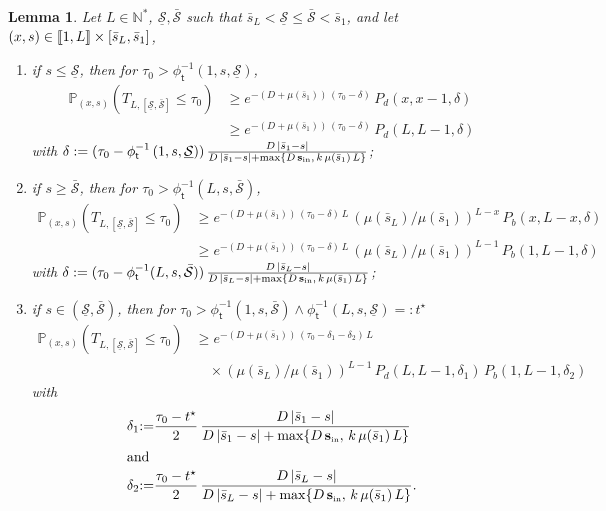 \documentclass[10pt]{amsart}
\newtheorem{lemm}[theo]{Lemma}\newtheorem{prop}[theo]{Proposition}\newtheorem{coro}[theo]{Corollary}\newtheorem{conj}[theo]{Conjecture}
\theoremstyle{definition}\newtheorem{defi}[theo]{Definition}\newtheorem{rema}[theo]{Remark}\newtheorem{exam}[theo]{Example}\newtheorem{exem}[theo]{Example}\newtheorem{nota}[theo]{Notation}
\newcommand{\llbracket}{\mathopen{[\mkern -2.7mu[}}
\newcommand{\rrbracket}{\mathclose{]\mkern -2.7mu]}}
\newcommand{\PP}{\mathbb{P}}
\newcommand{\NN}{\mathbb{N}}
\newcommand{\Sin}{{\mathbf s}_{\textrm{\tiny\rm in}}}
\newcommand{\Smin}{\underline{\mathcal{S}}}
\newcommand{\Smax}{\bar{\mathcal{S}}}
\newcommand{\barmu}{\mu(\bar s_1)}
\newcommand{\phit}{\phi_\textsf{t}^{-1}}
\newcommand{\1}{\mathbf{1}}
\begin{document}
\begin{lemm}\label{lemma.reach.T.Smin.Smax}
Let $L \in \NN^*$, $\Smin,\Smax$ such that $\bar s_L<\Smin\leq\Smax<\bar s_1$, and let $(x,s)\in \llbracket 1, L\rrbracket \times [\bar s_L,\bar s_1]$,
\begin{enumerate}
\item \label{lemma.reach.T.Smin.Smax.s_inf_Smin}
if $s\leq \Smin$, then for $\tau_0>\phit(1, s,\Smin)$,
\begin{align*}
\PP_{(x,s)}\left(T_{L,[\Smin,\Smax]}\leq \tau_0\right) &\geq e^{-(D+\barmu)\,(\tau_0-\delta)}\,P_d(x,x-1,\delta)\\
&\geq e^{-(D+\barmu)\,(\tau_0-\delta)}\,P_d(L,L-1,\delta)
\end{align*}
with $\delta:=(\tau_0-\phit\left(1, s,\Smin\right))\,\frac{D\,|\bar s_1-s|}{D\,|\bar s_1-s|+\max\{D\,\Sin,\,k\,\barmu\,L\}}$;

\item \label{lemma.reach.T.Smin.Smax.s_sup_Smax}
if $s\geq\Smax$, then for $\tau_0>\phit(L, s,\Smax)$,
\begin{align*}
\PP_{(x,s)}\left(T_{L,[\Smin,\Smax]}\leq \tau_0\right) &\geq e^{-(D+\barmu)\,(\tau_0-\delta)\,L}\,\left(\mu(\bar s_L)/\barmu\right)^{L-x}\, P_b(x,L-x, \delta)
\\
&\geq e^{-(D+\barmu)\,(\tau_0-\delta)\,L}\,
\left(\mu(\bar s_L)/\barmu\right)^{L-1}\,P_b(1,L-1, \delta)
\end{align*}
with $\delta:=(\tau_0-\phit(L, s,\Smax))\,\frac{D\,|\bar s_L-s|}{D\,|\bar s_L-s|+\max\{D\,\Sin,\,k\,\barmu\,L\}}$;

\item \label{lemma.reach.T.Smin.Smax.s_in_Smin_Smax}
if $s\in (\Smin,\Smax)$, then for $\tau_0>\phit(1, s,\Smax) \wedge \phit(L, s,\Smin)=:t^\star$
\begin{align*}
\PP_{(x,s)}\left(T_{L,[\Smin,\Smax]}\leq \tau_0\right) &\geq e^{-(D+\barmu)\,\left(\tau_0-\delta_1-\delta_2\right)\,L}\\
& \quad\times(\mu(\bar s_L)/\barmu)^{L-1}\,P_d(L,L-1, \delta_1)\, P_b(1,L-1, \delta_2)
\end{align*}
with 
\begin{align*}
\delta_1 &{:=}\frac{\tau_0-t^\star}{2}\,\frac{D\,|\bar s_1-s|}{D\,|\bar s_1-s|+\max\{D\,\Sin,\,k\,\barmu\,L\}}\\
\intertext{and}
\delta_2 &{:=}\frac{\tau_0-t^\star}{2}\,\frac{D\,|\bar s_L-s|}{D\,|\bar s_L-s|+\max\{D\,\Sin,\,k\,\barmu\,L\}}.
\end{align*}
\end{enumerate}
\end{lemm}
\end{document}
